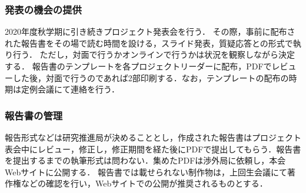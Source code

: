 \subsubsection* {発表の機会の提供}

2020年度秋学期に引き続きプロジェクト発表会を行う．
その際，事前に配布された報告書をその場で読む時間を設ける，スライド発表，質疑応答との形式で執り行う．
ただし，対面で行うかオンラインで行うかは状況を観察しながら決定する．
報告書のテンプレートを各プロジェクトリーダーに配布，PDFでレビューした後，対面で行うのであれば2部印刷する．なお，テンプレートの配布の時期は定例会議にて連絡を行う．


\subsubsection* {報告書の管理}

報告形式などは研究推進局が決めることとし，作成された報告書はプロジェクト表会中にレビュー，修正し，修正期間を経た後にPDFで提出してもらう．報告書を提出するまでの執筆形式は問わない．集めたPDFは渉外局に依頼し，本会Webサイトに公開する．
報告書では載せられない制作物は，上回生会議にて著作権などの確認を行い，Webサイトでの公開が推奨されるものとする．
